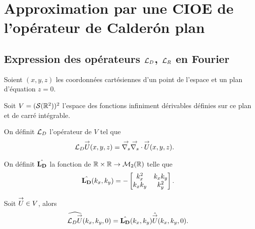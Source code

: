 \section{Approximation par une CIOE de l'opérateur de Calderón plan}

  \subsection[Expression des opérateurs LD, LR en Fourier]{Expression des opérateurs \({\mathcal{L}_D}\), \({\mathcal{L}_R}\) en Fourier}
    \label{sec:plan:hoibc:LD-LR}
    Soient \((x,y,z)\) les coordonnées cartésiennes d'un point de l'espace et un plan d'équation \(z=0\).

    Soit \(V=(\mathcal{S}(\mathbb R^2))^2\) l'espace des fonctions infiniment dérivables définies sur ce plan et de carré intégrable.

    \begin{defn}
      \label{eq:plan:fourier:LD}
      On définit \({\mathcal{L}_D}\) l'opérateur de \(V\) tel que
      \begin{align*}
        {\mathcal{L}_D} {\overset{\rightarrow}{U}}(x,y,z) & = {\overset{\rightarrow}{\nabla_s}}{} {\overset{\rightarrow}{\nabla_s}} \cdot{} {\overset{\rightarrow}{U}}(x,y,z).
      \end{align*}

      On définit \(\hat{\mathbf{L_D}}\) la fonction de \(\mathbb R\times\mathbb R \rightarrow \mathcal{M}_2(\mathbb R)\) telle que
      \begin{equation*}
        \hat{\mathbf{L_D}}(k_x,k_y) = -
        \begin{bmatrix}
          k_x^2 & k_xk_y
          \\
          k_xk_y & k_y^2
        \end{bmatrix}.
      \end{equation*}
    \end{defn}

    \begin{prop}
      Soit \({\overset{\rightarrow}{U}} \in V\), alors
      \begin{equation*}
        \widehat{{\mathcal{L}_D} {\overset{\rightarrow}{U}}} (k_x,k_y,0) = \hat{\mathbf{L_D}}(k_x,k_y) \hat{{\overset{\rightarrow}{U}}}(k_x,k_y,0).
      \end{equation*}
    \end{prop}

